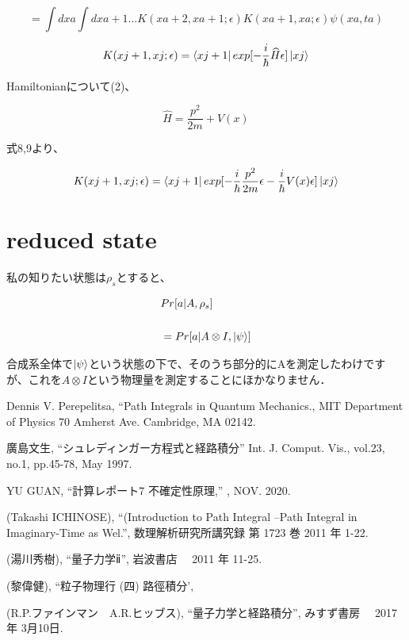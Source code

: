 \documentclass[xelatex,ja=standard,jafont=noto]{bxjsarticle}
\begin{document}
\begin{equation}
    =\int dxa\int dxa+1...K(xa+2,xa+1;\epsilon)K(xa+1,xa;\epsilon)\psi(xa,ta)
\end{equation}

\begin{equation}
    K(xj+1,xj;\epsilon)=\bra{xj+1}exp[-\frac{i}{\hbar}\widehat{H}\epsilon]\ket{xj}
\end{equation}

Hamiltonianについて(2)、

\begin{equation}
    \widehat{H}=\frac{p^{2}}{2m}+V(x)
\end{equation}

式8,9より、

\begin{equation}
    K(xj+1,xj;\epsilon)=\bra{xj+1}exp[-\frac{i}{\hbar}\frac{p^{2}}{2m}\epsilon-\frac{i}{\hbar}V(x)\epsilon]\ket{xj}
\end{equation}


\section{reduced state}

私の知りたい状態は$\rho_{s}$とすると、

\begin{equation}
    \begin{aligned}
      &Pr[a|A,\rho_{s}]\\
      \\
      &=Pr[a|A\otimes I,\ket{\psi}]
    \end{aligned}
\end{equation}

合成系全体で$\ket{\psi}$という状態の下で、そのうち部分的にAを測定したわけですが、これを$A\otimes I$という物理量を測定することにほかなりません．

\begin{thebibliography}{9}
   Dennis V. Perepelitsa,
    ``Path Integrals in Quantum Mechanics.,
    MIT Department of Physics
70 Amherst Ave.
Cambridge, MA 02142.

   廣島文生,
    ``シュレディンガー方程式と経路積分'' Int. J. Comput.
    Vis., vol.23, no.1, pp.45-78, May 1997.
    
 YU GUAN,
    ``計算レポート7
不確定性原理,'' , NOV. 2020.

 (Takashi ICHINOSE),
    ``(Introduction to Path Integral –Path Integral in Imaginary-Time as Wel.'',
    数理解析研究所講究録
第 1723 巻 2011 年 1-22.

 (湯川秀樹),
    ``量子力学ⅱ'',
    岩波書店　
 2011 年 11-25.
 
  (黎偉健),
    ``粒子物理行 (四) 路徑積分',
    
 (R.P.ファインマン　A.R.ヒッブス),
    ``量子力学と経路積分'',
    みすず書房　
 2017 年 3月10日.
  

\end{thebibliography}
\end{document}
